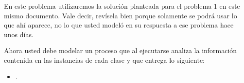 \documentclass[11pt,letterpaper]{article}
\begin{document}
\begin{spacing}{1.2}
\begin{NewAnswer}
\begin{ProbPart}
\end{ProbPart}

\end{NewAnswer}

\newpage

\begin{Problem}

    En este problema utilizaremos la solución planteada para el problema 1 en este mismo documento. Vale decir,
    revísela bien porque solamente se podrá usar lo que ahí aparece, no lo que usted modeló en su respuesta a
    ese problema hace unos días.

\begin{ProbPart}

Ahora usted debe modelar un proceso que al ejecutarse analiza la información contenida en las instancias
de cada clase y que entrega lo siguiente:

\begin{itemize}
    \item .
\end{itemize}


\end{ProbPart}

\end{Problem}


\end{spacing}
\end{document}
